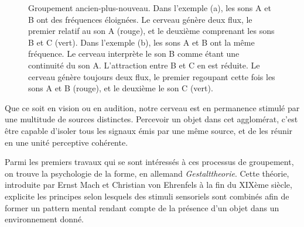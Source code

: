 \begin{figure}[t]
        \myfloatalign
        \caption[Groupement ancien-plus-nouveau.]{Groupement ancien-plus-nouveau. Dans l'exemple (a), les sons A et B ont des fréquences éloignées. Le cerveau génère deux flux, le premier relatif au son A (rouge), et le deuxième comprenant les sons B et C (vert). Dans l'exemple (b), les sons A et B ont la même fréquence. Le cerveau interprète le son B comme étant une continuité du son A. L'attraction entre B et C en est réduite. Le cerveau génère toujours deux flux, le premier regoupant cette fois les sons A et B (rouge), et le deuxième le son C (vert).}\label{fig:oldplusnew}
\end{figure}

Que ce soit en vision ou en audition, notre cerveau est en permanence stimulé par une multitude de sources distinctes. Percevoir un objet dans cet agglomérat, c'est être capable d'isoler tous les signaux émis par une même source, et de les réunir en une unité perceptive cohérente.

Parmi les premiers travaux qui se sont intéressés à ces processus de groupement, on trouve la psychologie de la forme, en allemand \emph{Gestalttheorie}. Cette théorie, introduite par Ernst Mach et Christian von Ehrenfels à la fin du XIXème siècle, explicite les principes selon lesquels des stimuli sensoriels sont combinés afin de former un pattern mental rendant compte de la présence d'un objet dans un environnement donné.

